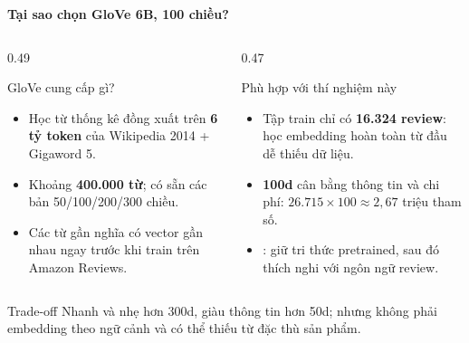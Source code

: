 \documentclass[aspectratio=169]{beamer}
\newcommand{\codeword}[1]{\texttt{\detokenize{#1}}}
\begin{document}
\begin{frame}{\textbf{\large Tại sao chọn GloVe 6B, 100 chiều?}}
    \begin{columns}[T,onlytextwidth]
        \begin{column}{0.49\textwidth}
            \begin{block}{GloVe cung cấp gì?}
                \begin{itemize}
                    \item Học từ thống kê đồng xuất trên \textbf{6 tỷ token}
                    của Wikipedia 2014 + Gigaword 5.
                    \item Khoảng \textbf{400.000 từ}; có sẵn các bản
                    50/100/200/300 chiều.
                    \item Các từ gần nghĩa có vector gần nhau ngay trước khi
                    train trên Amazon Reviews.
                \end{itemize}
            \end{block}
        \end{column}

        \begin{column}{0.47\textwidth}
            \begin{alertblock}{Phù hợp với thí nghiệm này}
                \begin{itemize}
                    \item Tập train chỉ có \textbf{16.324 review}: học embedding
                    hoàn toàn từ đầu dễ thiếu dữ liệu.
                    \item \textbf{100d} cân bằng thông tin và chi phí:
                    $26.715\times100\approx2,67$ triệu tham số.
                    \item \codeword{trainable=True}: giữ tri thức pretrained,
                    sau đó thích nghi với ngôn ngữ review.
                \end{itemize}
            \end{alertblock}
        \end{column}
    \end{columns}

    \vspace{0.18cm}
    \begin{exampleblock}{Trade-off}
        \centering
        Nhanh và nhẹ hơn 300d, giàu thông tin hơn 50d; nhưng không phải
        embedding theo ngữ cảnh và có thể thiếu từ đặc thù sản phẩm.
    \end{exampleblock}
\end{frame}
\end{document}

